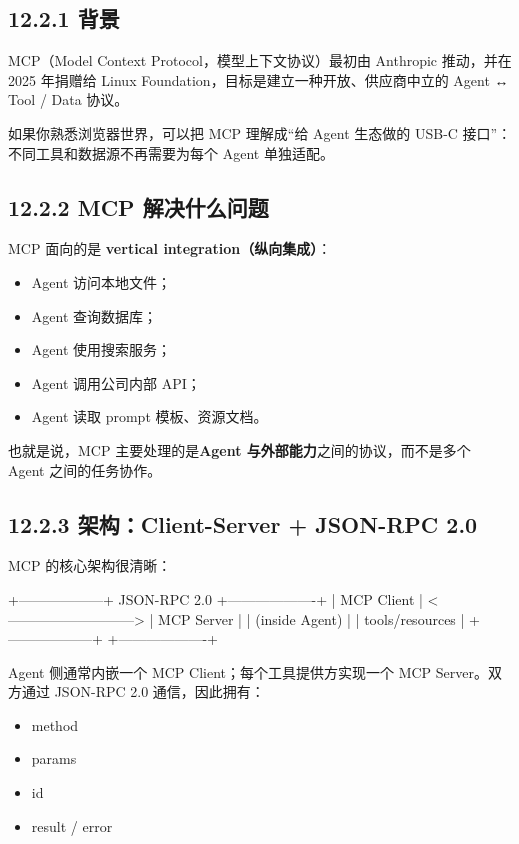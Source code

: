 \subsection{12.2.1 背景}

MCP（Model Context Protocol，模型上下文协议）最初由 Anthropic 推动，并在 2025 年捐赠给 Linux Foundation，目标是建立一种开放、供应商中立的 Agent ↔ Tool / Data 协议。


如果你熟悉浏览器世界，可以把 MCP 理解成``给 Agent 生态做的 USB-C 接口''：不同工具和数据源不再需要为每个 Agent 单独适配。


\subsection{12.2.2 MCP 解决什么问题}

MCP 面向的是 \textbf{vertical integration（纵向集成）}：


\begin{itemize}[leftmargin=2em]
\item Agent 访问本地文件；
\item Agent 查询数据库；
\item Agent 使用搜索服务；
\item Agent 调用公司内部 API；
\item Agent 读取 prompt 模板、资源文档。
\end{itemize}

也就是说，MCP 主要处理的是\textbf{Agent 与外部能力}之间的协议，而不是多个 Agent 之间的任务协作。


\subsection{12.2.3 架构：Client-Server + JSON-RPC 2.0}

MCP 的核心架构很清晰：


\begin{codeblock}
 +------------------+          JSON-RPC 2.0           +-------------------+
 |  MCP Client      |  <--------------------------->  |  MCP Server       |
 |  (inside Agent)  |                                 |  tools/resources   |
 +------------------+                                 +-------------------+
\end{codeblock}

Agent 侧通常内嵌一个 MCP Client；每个工具提供方实现一个 MCP Server。双方通过 JSON-RPC 2.0 通信，因此拥有：


\begin{itemize}[leftmargin=2em]
\item method
\item params
\item id
\item result / error
\end{itemize}

